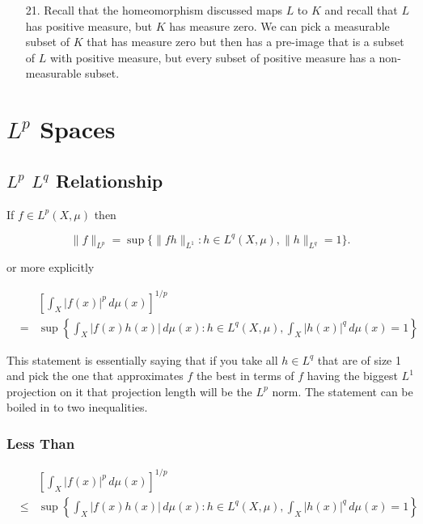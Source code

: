 \documentclass[oneside]{book}
\begin{document}
\begin{enumerate}
\item[21.] Recall that the homeomorphism discussed maps $L$ to $K$ and recall that $L$ has positive measure, but $K$ has measure zero. We can pick a measurable subset of $K$ that has measure zero but then has a pre-image that is a subset of $L$ with positive measure, but every subset of positive measure has a non-measurable subset. 


\end{enumerate}

\chapter{$L^p$ Spaces}

\section{$L^p$ $L^q$ Relationship}

If $f \in L^p(X,\mu)$ then 

\begin{equation}
\| f \|_{L^p} = \sup \{ \| fh \|_{L^1}: h \in L^q(X,\mu), \| h \|_{L^q}=1 \}.
\end{equation}

or more explicitly 

\begin{eqnarray}
&&\left[ \int_X |f(x)|^p \, d\mu(x) \right]^{1/p} \nonumber \\
&=& \sup \left\{ \int_X |f(x)h(x)| \, d\mu(x)  : h \in L^q(X,\mu),  \int_X |h(x)|^q \, d\mu(x) = 1  \right\}
\end{eqnarray}

This statement is essentially saying that if you take all $h \in L^q$ that are of size 1 and pick the one that approximates $f$ the best in terms of $f$ having the biggest $L^1$ projection on it that projection length will be the $L^p$ norm. The statement can be boiled in to two inequalities.

\subsection{Less Than}
\begin{eqnarray}
&&\left[ \int_X |f(x)|^p \, d\mu(x) \right]^{1/p} \nonumber \\
&\le& \sup \left\{ \int_X |f(x)h(x)| \, d\mu(x)  : h \in L^q(X,\mu),  \int_X |h(x)|^q \, d\mu(x) = 1  \right\}
\end{eqnarray}
\end{document}
